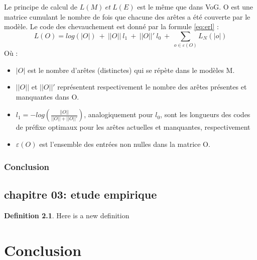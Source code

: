 \documentclass[11pt,a4paper]{report}
\theoremstyle{definition}
\newtheorem{defn}{Definition}[section]
\begin{document}
			Le principe de calcul de $L(M)\ et\ L(E)$ est le même que dans VoG. O est une matrice cumulant le nombre de fois que chacune des arêtes a été couverte par le modèle. Le code des chevauchement est donné par la formule \eqref{eq:erl}  :
			\begin{equation} \label{eq:erl}
				L(O) = log(|O|)\ +\ ||O||\ l_{1}\ +\ ||O||'\ l_{0}\ +\  \displaystyle{\sum_{o\in\varepsilon(O)}L_{N}(|o|)}
			\end{equation}
			Où :
			\begin{itemize}[label=$\circ$]
				\item $|O|$  est le nombre d'arêtes (distinctes) qui se répète dans le modèles M. 
				\item $||O||$ et $||O||'$ représentent respectivement le nombre des arêtes présentes et manquantes dans O.
				\item $l_{1} = -log (\frac{||O||}{||O||+||O||'})$, analogiquement pour $l_{0}$, sont les longueurs des codes de préfixe optimaux pour les arêtes actuelles et manquantes, respectivement
				\item $\varepsilon(O)$  est l'ensemble des entrées non nulles dans la matrice O.
			\end{itemize}
			
			
			
		\section{Conclusion}


	\chapter{chapitre 03: etude empirique}
	
	\begin{defn}
			Here is a new definition
	\end{defn}
	

\part{Conclusion} 




\newpage


\end{document}
